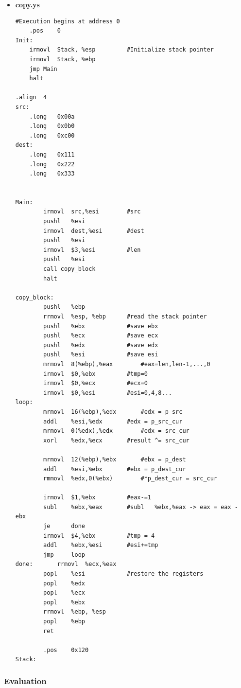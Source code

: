\documentclass{article}
\begin{document}
\begin{itemize}
\begin{lstlisting}[caption={}]
		.pos	0x120
Stack:
 


\end{lstlisting}

\item \textbf{copy.ys}
  \begin{lstlisting}[caption={}]
#Execution begins at address 0
	.pos	0
Init:
	irmovl	Stack, %esp			#Initialize stack pointer
	irmovl	Stack, %ebp
	jmp	Main
	halt

.align	4
src:
	.long	0x00a
	.long	0x0b0
	.long	0xc00
dest:
	.long	0x111
	.long	0x222
	.long	0x333


Main:
		irmovl	src,%esi		#src
		pushl	%esi
		irmovl	dest,%esi		#dest
		pushl	%esi
		irmovl	$3,%esi			#len
		pushl	%esi
		call copy_block	
		halt

copy_block:
		pushl	%ebp
		rrmovl	%esp, %ebp		#read the stack pointer
		pushl	%ebx			#save ebx
		pushl	%ecx			#save ecx
		pushl	%edx			#save edx
		pushl	%esi			#save esi
		mrmovl	8(%ebp),%eax		#eax=len,len-1,...,0
		irmovl	$0,%ebx			#tmp=0
		irmovl	$0,%ecx			#ecx=0
		irmovl	$0,%esi			#esi=0,4,8...
loop:	
		mrmovl	16(%ebp),%edx		#edx = p_src
		addl	%esi,%edx		#edx = p_src_cur
		mrmovl	0(%edx),%edx		#edx = src_cur
		xorl	%edx,%ecx		#result ^= src_cur

		mrmovl	12(%ebp),%ebx		#ebx = p_dest
		addl	%esi,%ebx		#ebx = p_dest_cur
		rmmovl	%edx,0(%ebx)		#*p_dest_cur = src_cur

		irmovl  $1,%ebx			#eax-=1
		subl	%ebx,%eax		#subl	%ebx,%eax -> eax = eax - ebx
		je		done
		irmovl	$4,%ebx			#tmp = 4
		addl	%ebx,%esi		#esi+=tmp
		jmp		loop
done:		rrmovl	%ecx,%eax
		popl	%esi			#restore the registers
		popl	%edx
		popl 	%ecx
		popl	%ebx
		rrmovl	%ebp, %esp
		popl	%ebp
		ret

		.pos	0x120
Stack:

\end{lstlisting}
\end{itemize}


\subsubsection{Evaluation}
\end{document}
